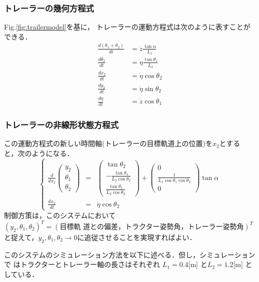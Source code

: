 \begin{frame}[t] 
\frametitle{トレーラーの幾何方程式}


Fig.\ref{fig:trailermodel}を基に，
トレーラーの運動方程式は次のように表すことができる．
\begin{align}
\frac{d(\theta_1 + \theta_2)}{dt} &= \dot{z} \frac{\tan \alpha}{L_1} \\
\frac{d\theta_2}{dt} &= \dot{\eta} \frac{\tan \theta_1}{L_2} \\
\frac{d x_2}{dt} &= \dot{\eta} \cos \theta_2 \\
\frac{d y_2}{dt} &= \dot{\eta} \sin \theta_2 \\
\frac{d \eta}{dt} &= \dot{z} \cos \theta_1
\end{align}
\end{frame}

\begin{frame}[t] 
\frametitle{トレーラーの非線形状態方程式}


この運動方程式の新しい時間軸(トレーラーの目標軌道上の位置)を$x_2$とする
と，次のようになる．
\begin{equation}
 \left\{
  \begin{array}{rcl}
   \displaystyle \frac{d}{dx_2}
    \left(
     \begin{array}{c}
      y_2 \\
      \theta_1 \\
      \theta_2
     \end{array}
    \right) &=&
    \left(
     \begin{array}{c}
      \tan \theta_2 \\
      -\frac{\tan \theta_1}{L_2 \cos \theta_2} \\
      \frac{\tan \theta_1}{L_2 \cos \theta_2} 
     \end{array}
    \right) +
    \left(
     \begin{array}{c}
      0 \\
      \frac{1}{L_1 \cos \theta_1 \cos \theta_2} \\
      0
     \end{array}
    \right) \tan \alpha \\
   \displaystyle \frac{dx_2}{dt} &=& \dot{\eta} \cos \theta_2
  \end{array}\right.
\end{equation}
制御方策は，このシステムにおいて$(y_2, \theta_1, \theta_2)^T = (\mbox{目標軌
道との偏差，トラクター姿勢角，トレーラー姿勢角})^T$と捉えて，$y_2, \theta_1,
\theta_2 \rightarrow 0$に追従させることを実現すればよい．

このシステムのシミュレーション方法を以下に述べる．但し，シミュレーションで
はトラクターとトレーラー軸の長さはそれぞれ $L_1 = 0.4$[m] と$L_2 = 1.2$[m]
としている．
\end{frame}

